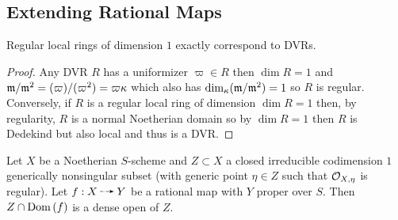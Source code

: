 \documentclass[12pt]{article}
\begin{document}
\subsection{Extending Rational Maps}

\begin{lemma}
Regular local rings of dimension $1$ exactly correspond to DVRs.
\end{lemma}

\begin{proof}
Any DVR $R$ has a uniformizer $\varpi \in R$ then $\dim{R} = 1$ and $\mathfrak{m} / \mathfrak{m}^2 = (\varpi)/(\varpi^2) = \varpi \kappa$ which also has $\dim_{\kappa}(\mathfrak{m} / \mathfrak{m}^2) = 1$ so $R$ is regular.
Conversely, if $R$ is a regular local ring of dimension $\dim{R} = 1$ then, by regularity, $R$ is a normal Noetherian domain so by $\dim{R} = 1$ then $R$ is Dedekind but also local and thus is a DVR. 
\end{proof}

\begin{proposition}
Let $X$ be a Noetherian $S$-scheme and $Z \subset X$ a closed irreducible codimension $1$ generically nonsingular subset (with generic point $\eta \in Z$ such that $\mathcal{O}_{X, \eta}$ is regular). Let $f : X \rat Y$ be a rational map with $Y$ proper over $S$. Then $Z \cap \mathrm{Dom}\left(f \right)$ is a dense open of $Z$.
\end{proposition}
\end{document}

